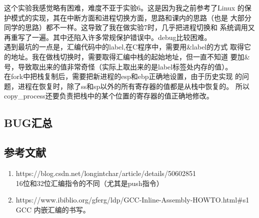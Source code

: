 \documentclass[a4paper]{article}
\begin{document}
    这个实验我感觉略有困难，难度不亚于实验6。这是因为我之前参考了Linux
    的保护模式的实现，其在中断方面和进程切换方面，思路和课内的思路（也是
    大部分同学的思路）都不一样。这导致了我在做实验7时，几乎把进程切换和
    系统调用又再重写了一遍。其中还陷入许多常规保护错误中。debug比较困难。\\ 

    遇到最坑的一点是，汇编代码中的label,在C程序中，需要用&label的方式
    取得它的地址。我在做栈切换时，需要取得汇编中栈的起始地址，但一直不知道
    要加&号，导致取出来的值非常奇怪（实际上取出来的是label标签处内存的值）。\\ 

    在fork中把栈复制后，需要把新进程的esp和ebp正确地设置，由于历史实现
    的问题，进程在恢复时，除了ss和sp以外的所有寄存器的值都是从栈中恢复的。
    所以copy_process还要负责把栈中的某个位置的寄存器的值正确地修改。
    \subsection{BUG汇总}\label{sec:bug}
\begin{appendices}
\section{参考文献} \label{sec:reference}
\begin{enumerate}
    \item https://blog.csdn.net/longintchar/article/details/50602851 \\
    16位和32位汇编指令的不同（尤其是push指令）
    \item https://www.ibiblio.org/gferg/ldp/GCC-Inline-Assembly-HOWTO.html\#s1 \\
    GCC 内嵌汇编的书写。
  \end{enumerate}
\end{appendices}
\end{document}
